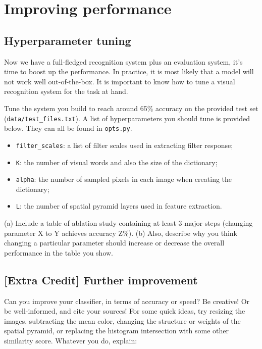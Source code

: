 \documentclass[11pt]{article}
\numberwithin{equation}{section} %
\numberwithin{figure}{section} %
\numberwithin{table}{section} %
\begin{document}
\begin{your_solution}[title=Q2.6, height=21cm]
\end{your_solution}

\clearpage

\section{Improving performance}

\subsection{Hyperparameter tuning}

Now we have a full-fledged recognition system plus an evaluation system, it's time to boost up the performance. In practice, it is most likely that a model will not work well out-of-the-box. It is important to know how to tune a visual recognition system for the task at hand. \\

\par {} Tune the system you build to reach around 65\% accuracy on the provided test set ({\tt data/test\_files.txt}). A list of hyperparameters you should tune is provided below. They can all be found in {\tt opts.py}.
\begin{itemize}
    \item {\tt filter\_scales}: a list of filter scales used in extracting filter response;
    \item {\tt K}: the number of visual words and also the size of the dictionary;
    \item {\tt alpha}: the number of sampled pixels in each image when creating the dictionary;
    \item {\tt L}: the number of spatial pyramid layers used in feature extraction.
\end{itemize}
 (a) Include a table of ablation study containing at least 3 major steps (changing parameter X to Y achieves accuracy Z\%). 
 (b) Also, describe why you think changing a particular parameter should increase or decrease the overall performance in the table you show.



\begin{your_solution}[title=Q3.1 (a) (b), height=12cm]
\end{your_solution}


\subsection{[Extra Credit] Further improvement}
 \par {} Can you improve your classifier, in terms of accuracy or speed? Be creative! Or be well-informed, and cite your sources! For some quick ideas, try resizing the images, subtracting the mean color, changing the structure or weights of the spatial pyramid, or replacing the histogram intersection with some other similarity score. Whatever you do, explain:
\end{document}
